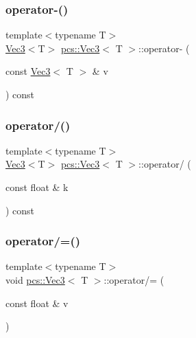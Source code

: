 \mbox{\label{structpcs_1_1Vec3_ac2d21d671207753c0a8bd9d61324dbfa}} 
\subsubsection{\texorpdfstring{operator-\/()}{operator-()}}
{\footnotesize\ttfamily template$<$typename T$>$ \\
\hyperlink{structpcs_1_1Vec3}{Vec3}$<$T$>$ \hyperlink{structpcs_1_1Vec3}{pcs\+::\+Vec3}$<$ T $>$\+::operator-\/ (\begin{DoxyParamCaption}\item[{const \hyperlink{structpcs_1_1Vec3}{Vec3}$<$ T $>$ \&}]{v }\end{DoxyParamCaption}) const\hspace{0.3cm}{\ttfamily [inline]}}

\mbox{\label{structpcs_1_1Vec3_adbb6f4a7af41335fee654be780bff5e5}} 
\subsubsection{\texorpdfstring{operator/()}{operator/()}}
{\footnotesize\ttfamily template$<$typename T$>$ \\
\hyperlink{structpcs_1_1Vec3}{Vec3}$<$T$>$ \hyperlink{structpcs_1_1Vec3}{pcs\+::\+Vec3}$<$ T $>$\+::operator/ (\begin{DoxyParamCaption}\item[{const float \&}]{k }\end{DoxyParamCaption}) const\hspace{0.3cm}{\ttfamily [inline]}}

\mbox{\label{structpcs_1_1Vec3_ad76313f0957aea2abb06b5a70ad7d492}} 
\subsubsection{\texorpdfstring{operator/=()}{operator/=()}}
{\footnotesize\ttfamily template$<$typename T$>$ \\
void \hyperlink{structpcs_1_1Vec3}{pcs\+::\+Vec3}$<$ T $>$\+::operator/= (\begin{DoxyParamCaption}\item[{const float \&}]{v }\end{DoxyParamCaption})\hspace{0.3cm}{\ttfamily [inline]}}




